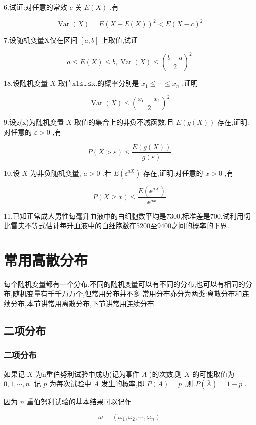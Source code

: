 6.试证:对任意的常效 $ c $ 关 $ E(X) $ ,有

\[
\operatorname{Var}(X)=E(X-E(X))^{2}<E(X-c)^{2}
\]

7.设随机变量X仅在区间 $ [a, b] $ 上取值,试证

\[
a \leqslant E(X) \leqslant b, \operatorname{Var}(X) \leqslant\left(\frac{b-a}{2}\right)^{2}
\]

18.设随机变量 $ X $ 取值x1≤…≤x.的概率分别是 $ x_{1} \leqslant \cdots \leqslant x_{n} $ .证明

\[
\operatorname{Var}(X) \leqslant\left(\frac{x_{\mathrm{n}}-x_{1}}{2}\right)^{2}
\]

9.设g(x)为随机变置 $ X $ 取值的集合上的非负不减函数,且 $ E(g(X)) $ 存在,证明:对任意的 $ \varepsilon>0 $ ,有

\[
P(X>\varepsilon) \leqslant \frac{E(g(X))}{g(\varepsilon)}
\]

10.设 $ X $ 为非负随机变量, $ a>0 $ .若 $ E\left(\ee ^{a X}\right) $ 存在,证明:对任意的 $ x>0 $ ,有

\[
P(X \geqslant x) \leqslant \frac{E\left(\ee ^{a X}\right)}{\ee ^{a x}}
\]

11.已知正常成人男性每毫升血液中的白细胞数平均是7300,标准差是700.试利用切比雪夫不等式估计每升血液中的白细胞数在5200至9400之间的概率的下界.

\section{常用高散分布}

每个随机变量都有一个分布,不同的随机变量可以有不同的分布,也可以有相同的分布,随机变量有千千万万个,但常用分布并不多.常用分布亦分为两类:离散分布和连续分布,本节讲常用离散分布,下节讲常用连续分布.

\subsection{二项分布}

\subsubsection{二项分布}

如果记 $ X $ 为n重伯努利试验中成功(记为事件 $ A $ )的次数,则 $ X $ 的可能取值为 $ 0,1, \cdots, n $ .记 $ p $ 为每次试验中 $ A $ 发生的概率,即 $ P(A)=p $ ,则 $ P(\bar{A})=1-p $ .

因为 $ n $ 重伯努利试验的基本结果可以记作


\[
\omega=\left(\omega_{1}, \omega_{2}, \cdots, \omega_{n}\right)
\]

